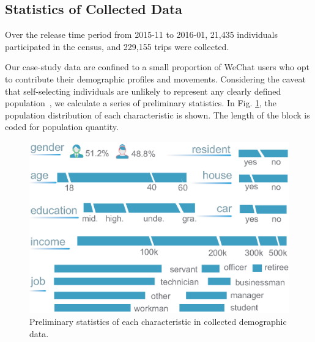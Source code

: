 \documentclass{ieeeaccess}
\begin{document}
\subsection{Statistics of Collected Data}

Over the release time period from 2015-11 to 2016-01, 21,435 individuals participated in the census, and 229,155 trips were collected.

Our case-study data are confined to a small proportion of WeChat users who opt to contribute their demographic profiles and movements. Considering the caveat that self-selecting individuals are unlikely to represent any clearly defined population~\cite{Longley2015}, we calculate a series of preliminary statistics. In Fig. \ref{fig:data_overview}, the population distribution of each characteristic is shown. The length of the block is coded for population quantity.

\begin{figure}[htb!]
 \centering %
 \includegraphics[width=\columnwidth]{pictures/data_overview}
 \caption{Preliminary statistics of each characteristic in collected demographic data.}
 \label{fig:data_overview}
\end{figure}
\end{document}
